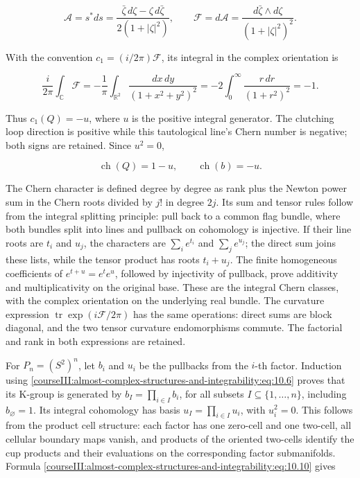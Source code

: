 \begin{equation}
\mathcal A=s^*ds=
\frac{\bar\zeta\,d\zeta-\zeta\,d\bar\zeta}{2(1+|\zeta|^2)},
\qquad
\mathcal F=d\mathcal A=
\frac{d\bar\zeta\wedge d\zeta}{(1+|\zeta|^2)^2}.
\label{courseIII:almost-complex-structures-and-integrability:eq:10.8}
\end{equation}

With the convention \(c_1=(i/2\pi)\mathcal F\), its integral in the complex orientation is

\begin{equation}
\frac{i}{2\pi}\int_{\mathbb C}\mathcal F
=-\frac1\pi\int_{\mathbb R^2}\frac{dx\,dy}{(1+x^2+y^2)^2}
=-2\int_0^\infty\frac{r\,dr}{(1+r^2)^2}=-1.
\label{courseIII:almost-complex-structures-and-integrability:eq:10.9}
\end{equation}

Thus \(c_1(Q)=-u\), where \(u\) is the positive integral generator. The clutching loop direction is positive while this tautological line's Chern number is negative; both signs are retained. Since \(u^2=0\),

\begin{equation}
\operatorname{ch}(Q)=1-u,
\qquad \operatorname{ch}(b)=-u.
\label{courseIII:almost-complex-structures-and-integrability:eq:10.10}
\end{equation}

The Chern character is defined degree by degree as rank plus the Newton power sum in the Chern roots divided by \(j!\) in degree \(2j\). Its sum and tensor rules follow from the integral splitting principle: pull back to a common flag bundle, where both bundles split into lines and pullback on cohomology is injective. If their line roots are \(t_i\) and \(u_j\), the characters are \(\sum_i e^{t_i}\) and \(\sum_j e^{u_j}\); the direct sum joins these lists, while the tensor product has roots \(t_i+u_j\). The finite homogeneous coefficients of \(e^{t+u}=e^te^u\), followed by injectivity of pullback, prove additivity and multiplicativity on the original base. These are the integral Chern classes, with the complex orientation on the underlying real bundle. The curvature expression \(\operatorname{tr}\exp(i\mathcal F/2\pi)\) has the same operations: direct sums are block diagonal, and the two tensor curvature endomorphisms commute. The factorial and rank in both expressions are retained.

For \(P_n=(S^2)^n\), let \(b_i\) and \(u_i\) be the pullbacks from the \(i\)-th factor. Induction using \eqref{courseIII:almost-complex-structures-and-integrability:eq:10.6} proves that its K-group is generated by \(b_I=\prod_{i\in I}b_i\), for all subsets \(I\subseteq\{1,\ldots,n\}\), including \(b_\varnothing=1\). Its integral cohomology has basis \(u_I=\prod_{i\in I}u_i\), with \(u_i^2=0\). This follows from the product cell structure: each factor has one zero-cell and one two-cell, all cellular boundary maps vanish, and products of the oriented two-cells identify the cup products and their evaluations on the corresponding factor submanifolds. Formula \eqref{courseIII:almost-complex-structures-and-integrability:eq:10.10} gives

